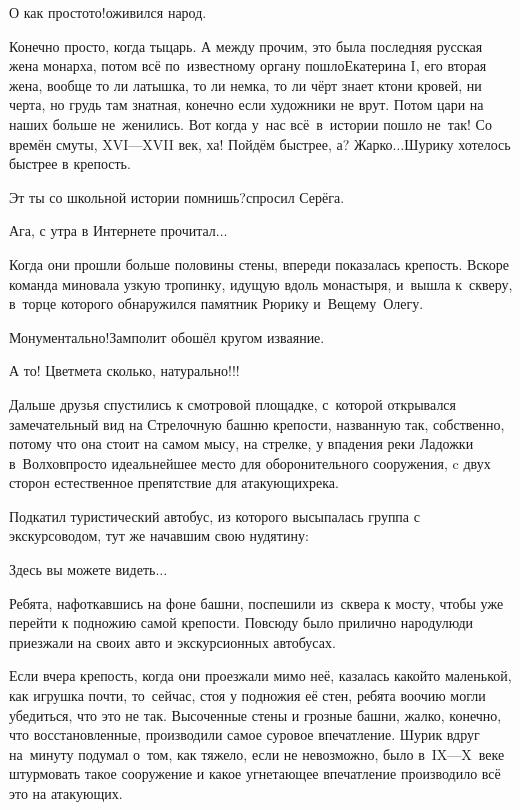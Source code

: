 \diagdash О как просто\sdash то!\mdash оживился народ.

\diagdash Конечно просто, когда ты\mdash царь. А между прочим, это была последняя русская жена монарха, потом всё по~известному органу пошло\mdash Екатерина I, его вторая жена, вообще то ли латышка, то ли немка, то ли чёрт знает кто\mdash ни кровей, ни черта, но грудь там знатная, конечно если художники не врут. Потом цари на наших больше не~женились. Вот когда у~нас всё~в~истории пошло не~так! Со времён смуты, XVI\thinspace\nobreakdash---\thinspace XVII век, ха! Пойдём быстрее, а? Жарко$\ldots$\mdash Шурику  хотелось быстрее в крепость.

\diagdash Эт ты со школьной истории помнишь?\mdash спросил Серёга.

\diagdash Ага, с утра в Интернете прочитал$\ldots$

Когда они прошли больше половины стены, впереди показалась крепость. Вскоре команда миновала узкую тропинку, идущую вдоль монастыря, и~вышла к~скверу, в~торце которого обнаружился памятник Рюрику и~Вещему~Олегу. 

\diagdash Монументально!\mdash Замполит обошёл кругом изваяние.

\diagdash А то! Цветмета сколько, натурально!!!

Дальше друзья спустились к смотровой площадке, с~которой открывался замечательный вид на Стрелочную башню крепости, названную так, собственно, потому что она стоит на самом мысу, на стрелке, у впадения реки Ладожки в~Волхов\mdash просто идеальнейшее место для оборонительного сооружения, c двух сторон естественное препятствие для атакующих\mdash река.

Подкатил туристический автобус, из которого высыпалась группа с экскурсоводом, тут же начавшим свою нудятину:

\diagdash Здесь вы можете видеть$\ldots$

Ребята, нафоткавшись на фоне башни, поспешили из~сквера к мосту, чтобы уже перейти к подножию самой крепости. Повсюду было прилично народу\mdash люди приезжали на своих авто и экскурсионных автобусах.

Если вчера крепость, когда они проезжали мимо неё, казалась какой\sdash то маленькой, как игрушка почти, то~сейчас, стоя у подножия её стен, ребята воочию могли убедиться, что это не так. Высоченные стены и грозные башни, жалко, конечно, что восстановленные, производили самое суровое впечатление. Шурик вдруг на~минуту подумал о~том, как тяжело, если не невозможно, было в~IX\thinspace\nobreakdash---\thinspace X~веке штурмовать такое сооружение и какое угнетающее впечатление производило всё это на атакующих.

